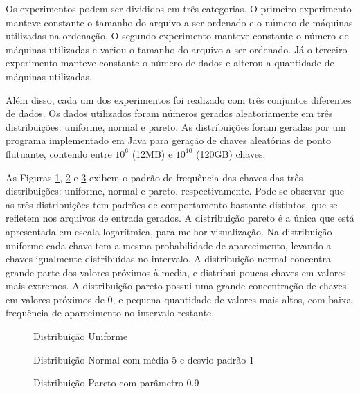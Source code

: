 Os experimentos podem ser divididos em três categorias. O primeiro experimento manteve constante o tamanho do arquivo a ser ordenado e o número de máquinas utilizadas na ordenação. O segundo experimento manteve constante o número de máquinas utilizadas e variou o tamanho do arquivo a ser ordenado. Já o terceiro experimento manteve constante o número de dados e alterou a quantidade de máquinas utilizadas. 


 Além disso, cada um dos experimentos foi realizado com três conjuntos diferentes de dados.
Os dados utilizados foram números gerados aleatoriamente em três distribuições: uniforme, normal e pareto. As distribuições foram geradas por um programa implementado em Java para geração de chaves aleatórias de ponto flutuante, contendo entre $10^{6}$ (12MB) e  $10^{10}$ (120GB) chaves. 

As Figuras \ref{fig:uniforme}, \ref{fig:normal} e \ref{fig:pareto} exibem o padrão de frequência das chaves das três distribuições: uniforme, normal e pareto, respectivamente. 
Pode-se observar que as três distribuições tem padrões de comportamento bastante distintos, que se refletem nos arquivos de entrada gerados. A distribuição pareto é a única que está apresentada em escala logarítmica, para melhor visualização. 
Na distribuição uniforme cada chave tem a mesma probabilidade de aparecimento, levando a chaves igualmente distribuídas no intervalo. A distribuição normal concentra grande parte dos valores próximos à media, e distribui poucas chaves em valores mais extremos. A distribuição pareto possui uma grande concentração de chaves em valores próximos de 0, e pequena quantidade de valores mais altos, com baixa frequência de aparecimento no intervalo restante. %

 \begin{figure}
 \centering
\caption{Distribuição Uniforme}
\label{fig:uniforme}
\end{figure}

  \begin{figure}
 \centering
\caption{Distribuição Normal com média 5 e desvio padrão 1}
\label{fig:normal}
\end{figure}

 \begin{figure}
 \centering
\caption{Distribuição Pareto com parâmetro 0.9}
\label{fig:pareto}
\end{figure}

